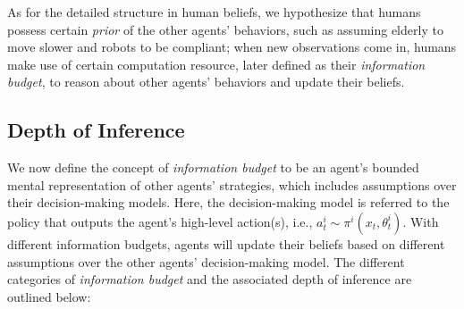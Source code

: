 \documentclass[letterpaper, 10 pt, conference]{ieeeconf}  %
\begin{document}
As for the detailed structure in human beliefs, we hypothesize that humans 
possess certain \textit{prior} of the other agents' behaviors, such as assuming 
elderly to move slower and robots to be compliant; when new observations come 
in, humans make use of certain computation resource, later defined as their \textit{information budget},
to reason about 
other agents' behaviors and update their beliefs.

\subsection{Depth of Inference}
We now define the concept of \textit{information budget} to be an agent's 
bounded mental representation of other agents' strategies, 
which includes assumptions over their decision-making models. Here, the 
decision-making model is referred to the policy that outputs 
the agent's high-level action(s), i.e., 
$a^i_{t} \sim \pi^i(x_t,\theta^i_t)$. With different information budgets, 
agents will update their beliefs based on different assumptions over the 
other agents' decision-making model. The different categories of 
\textit{information budget}  and the associated depth of inference are outlined below:
\end{document}
